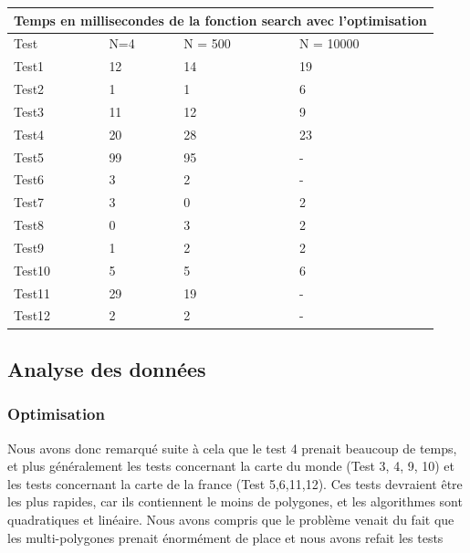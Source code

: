 \documentclass[utf8]{article}
\begin{document}
\begin{large}
  \begin{tabular}{ |p{3cm}||p{3cm}|p{3cm}|p{3cm}|  }
    \hline
    \multicolumn{4}{|c|}{Temps en millisecondes de la fonction search avec l'optimisation} \\
    \hline
    Test   & N=4 & N = 500 & N = 10000                                                     \\
    \hline
    Test1  & 12  & 14      & 19                                                            \\
    Test2  & 1   & 1       & 6                                                             \\
    Test3  & 11  & 12      & 9                                                             \\
    Test4  & 20  & 28      & 23                                                            \\
    Test5  & 99  & 95      & -                                                             \\
    Test6  & 3   & 2       & -                                                             \\
    Test7  & 3   & 0       & 2                                                             \\
    Test8  & 0   & 3       & 2                                                             \\
    Test9  & 1   & 2       & 2                                                             \\
    Test10 & 5   & 5       & 6                                                             \\
    Test11 & 29  & 19      & -                                                             \\
    Test12 & 2   & 2       & -                                                             \\
    \hline
  \end{tabular}



  \subsection{Analyse des données}
  \subsubsection{Optimisation}
  \par
  \indent
  Nous avons donc remarqué suite à cela que le test 4 prenait beaucoup de temps,
  et plus généralement les tests concernant la carte du monde (Test 3, 4, 9, 10)
  et les tests concernant la carte de la france (Test 5,6,11,12). Ces tests
  devraient être les plus rapides, car ils contiennent le moins de polygones, et
  les algorithmes sont quadratiques et linéaire. Nous avons compris que le
  problème venait du fait que les multi-polygones prenait énormément de place et nous avons refait les tests

\end{large}
\end{document}
